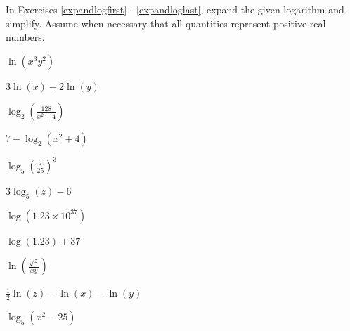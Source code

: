\documentclass{ximera}
\begin{document}
	\author{Stitz-Zeager}



\label{ExercisesforPropertiesofLogarithms}

\begin{question}
In Exercises \ref{expandlogfirst} - \ref{expandloglast}, expand the given logarithm and simplify.  Assume when necessary that all quantities represent positive real numbers.

\begin{problem}\label{expandlogfirst}
$\ln(x^{3}y^{2})$

\begin{solution}
$3\ln(x) + 2\ln(y)$
\end{solution}
\end{problem}

\begin{problem}
$\log_{2}\left(\frac{128}{x^{2} + 4}\right)$

\begin{solution}
    $7 - \log_{2}(x^{2} + 4)$
\end{solution}
\end{problem}

\begin{problem}
$\log_{5}\left(\frac{z}{25}\right)^{3}$ 

\begin{solution}
$3\log_{5}(z) - 6$
\end{solution}
\end{problem}
 

\begin{problem}
    $\log(1.23 \times 10^{37})$

    \begin{solution}
        $\log(1.23) + 37$
    \end{solution}
    
\end{problem}

\begin{problem}
    $\ln\left(\frac{\sqrt{z}}{xy}\right)$

\begin{solution}
$\frac{1}{2}\ln(z) - \ln(x) - \ln(y)$
\end{solution}
\end{problem}

\begin{problem}
    $\log_{5} \left(x^2 - 25 \right)$


\end{problem}
\end{question}
\end{document}
